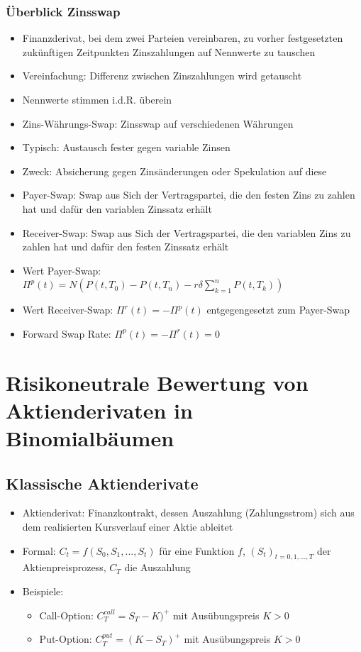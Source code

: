 \documentclass[12pt]{report}
\theoremstyle{dotless}
\theoremstyle{definition}
\begin{document}
\subsubsection{\"Uberblick Zinsswap}

\begin{itemize}
	\item Finanzderivat, bei dem zwei Parteien vereinbaren, zu vorher festgesetzten zuk\"unftigen Zeitpunkten Zinszahlungen auf Nennwerte zu tauschen
	\item Vereinfachung: Differenz zwischen Zinszahlungen wird getauscht
	\item Nennwerte stimmen i.d.R. \"uberein
	\item Zins-W\"ahrungs-Swap: Zinsswap auf verschiedenen W\"ahrungen
	\item Typisch: Austausch fester gegen variable Zinsen
	\item Zweck: Absicherung gegen Zins\"anderungen oder Spekulation auf diese
	\item Payer-Swap: Swap aus Sich der Vertragspartei, die den festen Zins zu zahlen hat und daf\"ur den variablen Zinssatz erh\"alt
	\item Receiver-Swap: Swap aus Sich der Vertragspartei, die den variablen Zins zu zahlen hat und daf\"ur den festen Zinssatz erh\"alt
	\item Wert Payer-Swap: $\Pi^p(t) = N(P(t,T_0) - P(t,T_n) - r \delta \sum_{k=1}^n P(t,T_k))$
	\item Wert Receiver-Swap: $\Pi^r(t) = - \Pi^p(t)$ entgegengesetzt zum Payer-Swap
	\item Forward Swap Rate: $\Pi^p(t) = - \Pi^r(t) = 0$
\end{itemize}

\section{Risikoneutrale Bewertung von Aktienderivaten in Binomialb\"aumen}

\subsection{Klassische Aktienderivate}

\begin{itemize}
	\item Aktienderivat: Finanzkontrakt, dessen Auszahlung (Zahlungsstrom) sich aus dem realisierten Kursverlauf einer Aktie ableitet
	\item Formal: $C_t = f(S_0,S_1,...,S_t)$ f\"ur eine Funktion $f$, $(S_t)_{t=0,1,...,T}$ der Aktienpreisprozess, $C_T$ die Auszahlung
	\item Beispiele:
	\begin{itemize}
		\item Call-Option: $C_T^{call} = S_T-K)^+$ mit Aus\"ubungspreis $K>0$
		\item Put-Option: $C_T^{put} = (K-S_T)^+$ mit Aus\"ubungspreis $K>0$
	\end{itemize}
\end{itemize}
\end{document}
